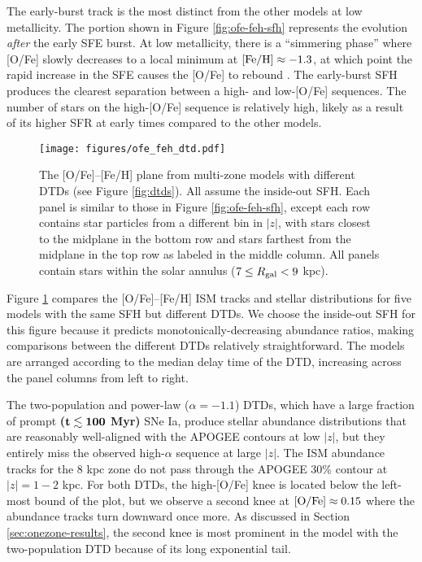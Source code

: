 \documentclass[twocolumn,twocolappendix,linenumbers]{aastex631}
\begin{document}
The early-burst track is the most distinct from the other models at low metallicity. The portion shown in Figure \ref{fig:ofe-feh-sfh} represents the evolution {\it after} the early SFE burst. At low metallicity, there is a ``simmering phase'' where [O/Fe] slowly decreases to a local minimum at ${\rm [Fe/H]}\approx-1.3$, at which point the rapid increase in the SFE causes the [O/Fe] to rebound \citep[a more thorough examination of this behavior can be found in][]{Conroy2022-ThickDisk}.
The early-burst SFH produces the clearest separation between a high- and low-[O/Fe] sequences. The number of stars on the high-[O/Fe] sequence is relatively high, likely as a result of its higher SFR at early times compared to the other models.

\begin{figure*}
    \centering
    \texttt{[image: figures/ofe\_feh\_dtd.pdf]}
    \caption{The [O/Fe]--[Fe/H] plane from multi-zone models with different DTDs (see Figure \ref{fig:dtds}). All assume the inside-out SFH. Each panel is similar to those in Figure \ref{fig:ofe-feh-sfh}, except each row contains star particles from a different bin in $|z|$, with stars closest to the midplane in the bottom row and stars farthest from the midplane in the top row as labeled in the middle column. All panels contain stars within the solar annulus ($7\leq R_{\rm gal}<9$ kpc).}
    \label{fig:ofe-feh-dtd}
\end{figure*}

Figure \ref{fig:ofe-feh-dtd} compares the [O/Fe]--[Fe/H] ISM tracks and stellar distributions for five models with the same SFH but different DTDs. We choose the inside-out SFH for this figure because it predicts monotonically-decreasing abundance ratios, making comparisons between the different DTDs relatively straightforward. The models are arranged according to the median delay time of the DTD, increasing across the panel columns from left to right. 

The two-population and power-law ($\alpha=-1.1$) DTDs, which have a large fraction of prompt {\bf ($\bf t\lesssim100$ Myr)} SNe Ia, produce stellar abundance distributions that are reasonably well-aligned with the APOGEE contours at low $|z|$, but they entirely miss the observed high-$\alpha$ sequence at large $|z|$. The ISM abundance tracks for the 8 kpc zone do not pass through the APOGEE 30\% contour at $|z|=1-2$ kpc. For both DTDs, the high-[O/Fe] knee is located below the left-most bound of the plot, but we observe a second knee at ${\rm [O/Fe]}\approx0.15$ where the abundance tracks turn downward once more. As discussed in Section \ref{sec:onezone-results}, the second knee is most prominent in the model with the two-population DTD because of its long exponential tail.
\end{document}

